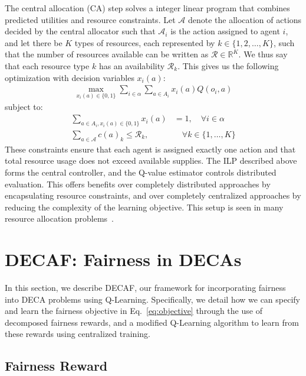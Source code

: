 The central allocation (CA) step solves a integer linear program that combines predicted utilities and resource constraints. 
Let $\mathcal{A}$ denote the allocation of actions decided by the central allocator such that $\mathcal{A}_i$ is the action assigned to agent $i$,
and let there be $K$ types of resources, each represented by $k\in\{1,2,\dots,K\}$, such that the number of resources available can be written as $\mathcal{R}\in\mathbb{R}^K$. 
We thus say that each resource type $k$ has an availability $\mathcal{R}_k$. This gives us the following optimization with decision variables $x_i(a)$:
\begin{align}
    \max_{x_i(a) \in \{0,1\}} \sum_{i \in \alpha} \sum_{a \in A_i} x_i(a) Q(o_i,a) \label{eq:Opt_DECAF}
\end{align}
subject to:
\begin{align}
    \sum_{a \in A_i, x_i(a) \in \{0,1\}} x_i(a) &= 1, \quad \forall i \in \alpha \label{eq:action_constraint}\\
    \sum_{a \in \mathcal{A}} c(a)_k \le \mathcal{R}_k, & \quad \forall k \in \{1, \ldots, K\} \label{eq:resource_constraint}
\end{align}
These constraints ensure that each agent is assigned exactly one action and that total resource usage does not exceed available supplies.
The ILP described above forms the central controller, and the Q-value estimator controls distributed evaluation. This offers benefits over completely distributed approaches by encapsulating resource constraints, and over completely centralized approaches by reducing the complexity of the learning objective. 
This setup is seen in many resource allocation problems~\citep{kube2019allocating, ride_alonso, shah2020neural}.

\section{DECAF: Fairness in DECAs}
\label{sec:fairness_in_decas}


In this section, we describe DECAF, our framework for incorporating fairness into DECA problems using Q-Learning. Specifically, we detail how we can specify and learn the fairness objective in Eq.~\ref{eq:objective} through the use of decomposed fairness rewards, and a modified Q-Learning algorithm to learn from these rewards using centralized training.

\subsection{Fairness Reward}


